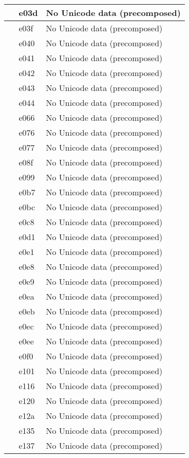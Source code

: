 \documentclass[12pt,letterpaper,openany]{book}
\begin{document}
\begin{center}
\begin{supertabular}{|m{0.25in}|m{0.5in}|m{4in}|}
 & e03d & No Unicode data (precomposed)\\\hline
 & e03f & No Unicode data (precomposed)\\\hline
 & e040 & No Unicode data (precomposed)\\\hline
 & e041 & No Unicode data (precomposed)\\\hline
 & e042 & No Unicode data (precomposed)\\\hline
 & e043 & No Unicode data (precomposed)\\\hline
 & e044 & No Unicode data (precomposed)\\\hline
 & e066 & No Unicode data (precomposed)\\\hline
 & e076 & No Unicode data (precomposed)\\\hline
 & e077 & No Unicode data (precomposed)\\\hline
 & e08f & No Unicode data (precomposed)\\\hline
 & e099 & No Unicode data (precomposed)\\\hline
 & e0b7 & No Unicode data (precomposed)\\\hline
 & e0bc & No Unicode data (precomposed)\\\hline
 & e0c8 & No Unicode data (precomposed)\\\hline
 & e0d1 & No Unicode data (precomposed)\\\hline
 & e0e1 & No Unicode data (precomposed)\\\hline
 & e0e8 & No Unicode data (precomposed)\\\hline
 & e0e9 & No Unicode data (precomposed)\\\hline
 & e0ea & No Unicode data (precomposed)\\\hline
 & e0eb & No Unicode data (precomposed)\\\hline
 & e0ec & No Unicode data (precomposed)\\\hline
 & e0ee & No Unicode data (precomposed)\\\hline
 & e0f0 & No Unicode data (precomposed)\\\hline
 & e101 & No Unicode data (precomposed)\\\hline
 & e116 & No Unicode data (precomposed)\\\hline
 & e120 & No Unicode data (precomposed)\\\hline
 & e12a & No Unicode data (precomposed)\\\hline
 & e135 & No Unicode data (precomposed)\\\hline
 & e137 & No Unicode data (precomposed)\\\hline

\end{supertabular}
\end{center}
\end{document}
